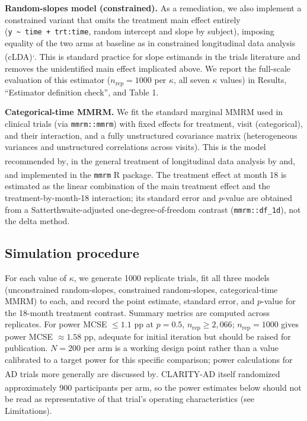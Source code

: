 \documentclass[
  11pt,
]{article}
\begin{document}
\textbf{Random-slopes model (constrained).} As a remediation, we
also implement a constrained variant that omits the treatment
main effect entirely (\texttt{y\ \textasciitilde{}\ time\ +\ trt:time}, random intercept
and slope by subject), imposing equality of the two arms at
baseline as in constrained longitudinal data analysis (cLDA)\textsuperscript{,}. This is standard practice
for slope estimands in the trials literature and removes the
unidentified main effect implicated above. We report the
full-scale evaluation of this estimator (\(n_{\mathrm{rep}} =
1000\) per \(\kappa\), all seven \(\kappa\) values) in Results,
``Estimator definition check'', and Table 1.

\textbf{Categorical-time MMRM.} We fit the standard marginal MMRM
used in clinical trials (via \texttt{mmrm::mmrm}) with fixed effects
for treatment, visit (categorical), and their interaction, and
a fully unstructured covariance matrix (heterogeneous
variances and unstructured correlations across visits). This
is the model recommended by\textsuperscript{}, in the general treatment of
longitudinal data analysis by\textsuperscript{} and\textsuperscript{}, and implemented in the \texttt{mmrm} R
package\textsuperscript{}. The treatment effect
at month 18 is estimated as the linear combination of the
main treatment effect and the treatment-by-month-18
interaction; its standard error and \(p\)-value are obtained
from a Satterthwaite-adjusted one-degree-of-freedom contrast
(\texttt{mmrm::df\_1d}), not the delta method.

\subsection{Simulation procedure}\label{simulation-procedure}

For each value of \(\kappa\), we generate 1000 replicate
trials, fit all three models (unconstrained random-slopes,
constrained random-slopes, categorical-time MMRM) to each, and
record the point estimate, standard error, and \(p\)-value for the
18-month treatment contrast. Summary metrics are computed across
replicates. For power MCSE \(\leq 1.1\) pp at \(p = 0.5\),
\(n_{\mathrm{rep}} \geq 2{,}066\); \(n_{\mathrm{rep}} = 1000\) gives
power MCSE \(\approx 1.58\) pp, adequate for initial iteration but
should be raised for publication. \(N = 200\) per arm is a
working design point rather than a value calibrated to a
target power for this specific comparison; power calculations
for AD trials more generally are discussed by\textsuperscript{}.
CLARITY-AD itself randomized approximately 900 participants
per arm\textsuperscript{}, so the power estimates below
should not be read as representative of that trial's operating
characteristics (see Limitations).
\end{document}
